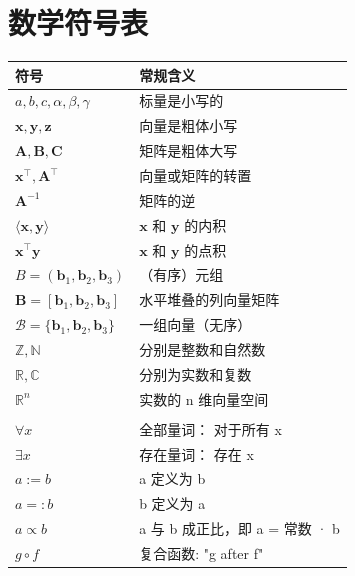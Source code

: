 \chapter*{数学符号表}

\begin{longtable}{>{\raggedright\arraybackslash}p{\dimexpr(\textwidth-24pt)/2\relax} >{\raggedright\arraybackslash}p{\dimexpr(\textwidth-24pt)/2\relax}}
\hline
\textbf{符号} & \textbf{常规含义} \\ \hline
\endhead
$a, b, c, \alpha, \beta, \gamma$ & 标量是小写的 \\ \hline
${\boldsymbol{x}, \boldsymbol{y}, \boldsymbol{z}}$ & 向量是粗体小写 \\ \hline
${\boldsymbol{A}, \boldsymbol{B},\boldsymbol{C}}$ & 矩阵是粗体大写 \\ \hline
$\boldsymbol{x}^\top, \boldsymbol{A}^\top$ & 向量或矩阵的转置 \\ \hline
$\boldsymbol{A}^{-1}$ & 矩阵的逆 \\ \hline
$\langle \boldsymbol{x}, \boldsymbol{y} \rangle$ & $\boldsymbol{x}$ 和 $\boldsymbol{y}$ 的内积 \\ \hline
$\boldsymbol{x}^\top \boldsymbol{y}$ & $\boldsymbol{x}$ 和 $\boldsymbol{y}$ 的点积 \\ \hline
$B = (\boldsymbol{b}_1, \boldsymbol{b}_2 ,\boldsymbol{b}_3 )$ & （有序）元组 \\ \hline
$\boldsymbol{B} = [\boldsymbol{b}_1, \boldsymbol{b}_2 ,\boldsymbol{b}_3]$ & 水平堆叠的列向量矩阵 \\ \hline
$\mathcal B = \{\boldsymbol{b}_1, \boldsymbol{b}_2 ,\boldsymbol{b}_3 \}$ & 一组向量（无序） \\ \hline
$\mathbb{Z}, \mathbb{N}$ & 分别是整数和自然数 \\ \hline
$\mathbb{R}, \mathbb{C}$ & 分别为实数和复数 \\ \hline
$\mathbb{R}^n$ & 实数的 n 维向量空间 \\ \hline
 &  \\ \hline
$\forall x$ & 全部量词：  对于所有 x \\ \hline
$\exists x$ & 存在量词：  存在 x \\ \hline
$a := b$ & a 定义为 b \\ \hline
$a =: b$ & b 定义为 a \\ \hline
$a \propto b$ & a 与 b 成正比，即 a = 常数 · b \\ \hline
$g \circ f$ & 复合函数: "g after f" \\ \hline

\end{longtable}
